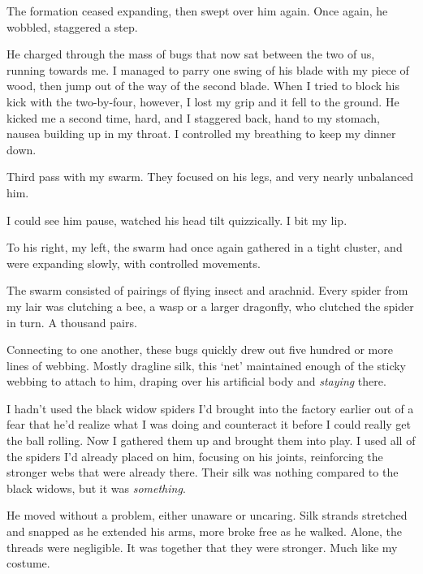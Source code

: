 The formation ceased expanding, then swept over him again.  Once again, he wobbled, staggered a step.



He charged through the mass of bugs that now sat between the two of us, running towards me.  I managed to parry one swing of his blade with my piece of wood, then jump out of the way of the second blade.  When I tried to block his kick with the two-by-four, however, I lost my grip and it fell to the ground.  He kicked me a second time, hard, and I staggered back, hand to my stomach, nausea building up in my throat.  I controlled my breathing to keep my dinner down.



Third pass with my swarm.  They focused on his legs, and very nearly unbalanced him.



I could see him pause, watched his head tilt quizzically.  I bit my lip.



To his right, my left, the swarm had once again gathered in a tight cluster, and were expanding slowly, with controlled movements.



The swarm consisted of pairings of flying insect and arachnid.  Every spider from my lair was clutching a bee, a wasp or a larger dragonfly, who clutched the spider in turn.  A thousand pairs.



Connecting to one another, these bugs quickly drew out five hundred or more lines of webbing.  Mostly dragline silk, this `net' maintained enough of the sticky webbing to attach to him, draping over his artificial body and \emph{staying} there.



I hadn't used the black widow spiders I'd brought into the factory earlier out of a fear that he'd realize what I was doing and counteract it before I could really get the ball rolling.  Now I gathered them up and brought them into play.  I used all of the spiders I'd already placed on him, focusing on his joints, reinforcing the stronger webs that were already there.  Their silk was nothing compared to the black widows, but it was \emph{something}.



He moved without a problem, either unaware or uncaring.  Silk strands stretched and snapped as he extended his arms, more broke free as he walked.  Alone, the threads were negligible.  It was together that they were stronger.  Much like my costume.



